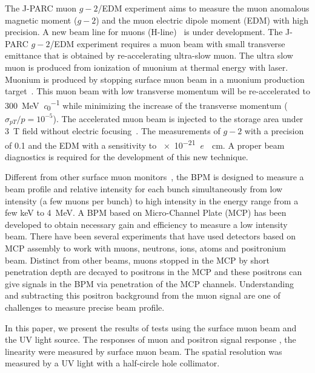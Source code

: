 \documentclass[preprint,3p,twocolumn]{elsarticle}
\begin{document}
The J-PARC muon $g-2$/EDM experiment \cite{E34} aims to measure the muon anomalous magnetic moment ($g-2$) and the muon electric dipole moment (EDM) with high precision.
A new beam line for muons (H-line)~\cite{h-line} is under development.
The J-PARC $g-2$/EDM experiment requires a muon beam with small transverse emittance that is obtained by re-accelerating ultra-slow muon. %
The ultra slow muon is produced from ionization of muonium at thermal energy with laser.
Muonium is produced by stopping surface muon beam in a muonium production target~\cite{muonium}.  
This muon beam with low transverse momentum will be re-accelerated to \SI{300}{\MeV\per\clight} \cite{IH} while minimizing the increase of the transverse momentum ($\sigma_{pT}/p = 10^{-5}$).
The accelerated muon beam is injected to the storage area under \SI{3}{\tesla} field without electric focusing~\cite{injection}. The measurements of $g-2$ with a precision of \SI{0.1}{\ppm} and the EDM with a sensitivity to \SI{e-21}{\elementarycharge \cdot \cm}.  A proper beam diagnostics is required for the development of this new technique. 

Different from other surface muon monitors~\cite{muon_bpm1}, the BPM is designed to measure a beam profile and relative intensity for each bunch simultaneously from low intensity (a few muons per bunch) to high intensity in the energy range from a few \si{keV} to \SI{4}{\MeV}.
A BPM based on Micro-Channel Plate (MCP) has been developed to obtain necessary gain and efficiency to measure a low intensity beam.
There have been several experiments that have used detectors based on MCP assembly to work with muons, neutrons, ions, atoms and positronium~\cite{muon_bpm2, neutron, Ps} beam.
Distinct from other beams, muons stopped in the MCP by short penetration depth are decayed to positrons in the MCP and these positrons can give signals in the BPM via penetration of the MCP channels. 
Understanding and subtracting this positron background from the muon signal are one of challenges to measure precise beam profile. %

In this paper, we present the results of tests using the surface muon beam and the UV light source.
The responses of muon and positron signal response %
, the linearity%
were measured by surface muon beam.
The spatial resolution was measured by a UV light with a half-circle hole collimator.
\end{document}
